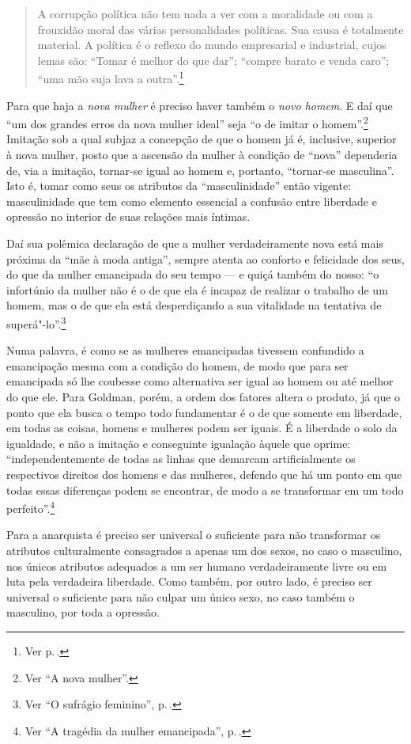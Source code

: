 \begin{quote}
A corrupção política não tem nada a ver com a
moralidade ou com a frouxidão moral das várias personalidades
políticas. Sua causa é totalmente material. A política é o reflexo do
mundo empresarial e industrial, cujos lemas são: ``Tomar é melhor do que
dar''; ``compre barato e venda caro''; ``uma mão suja lava a outra''.\footnote{Ver p.\,\pageref{suja}.}
\end{quote}

Para que haja a \textit{nova mulher} é preciso haver também o \textit{novo homem}. E
daí que ``um dos grandes erros da nova mulher ideal'' seja ``o de imitar
o homem''.\footnote{Ver ``A nova mulher''.} Imitação sob a qual subjaz a concepção de
que o homem já é, inclusive, superior à nova mulher, posto que a
ascensão da mulher à condição de ``nova'' dependeria de, via a imitação,
tornar-se igual ao homem e, portanto, ``tornar-se masculina''. Isto é,
tomar como seus os atributos da ``masculinidade'' então vigente:
masculinidade que tem como elemento essencial a confusão entre liberdade e opressão no interior de suas relações mais íntimas.

Daí sua polêmica
declaração de que a mulher verdadeiramente nova está mais próxima da
``mãe à moda antiga'', sempre atenta ao conforto e felicidade dos seus,
do que da mulher emancipada do seu tempo --- e quiçá também do nosso:
``o infortúnio da mulher não é o de que ela é incapaz de realizar o
trabalho de um homem, mas o de que ela está desperdiçando a sua
vitalidade na tentativa de superá"-lo''.\footnote{Ver ``O sufrágio feminino'', p.\,\pageref{secular}.}

Numa palavra, é como se as mulheres emancipadas tivessem
confundido a emancipação mesma com a condição do homem, de modo que para
ser emancipada só lhe coubesse como alternativa ser igual ao homem ou
até melhor do que ele. Para Goldman, porém, a ordem dos fatores
altera o produto, já que o ponto que ela
busca o tempo todo fundamentar é o de que somente em liberdade,
em todas as coisas, homens e mulheres podem ser iguais. É a liberdade
o solo da igualdade, e não a imitação e conseguinte igualação
àquele que oprime: ``independentemente de todas as linhas que demarcam artificialmente os
respectivos direitos dos homens e das mulheres, defendo que há um ponto
em que todas essas diferenças podem se encontrar, de modo a se
transformar em um todo perfeito''.\footnote{Ver ``A tragédia da mulher emancipada'', p.\,\pageref{perfeito}.}


Para
a anarquista é preciso ser universal o suficiente para não transformar
os atributos culturalmente consagrados a apenas um dos sexos, no caso o
masculino, nos únicos atributos adequados a um ser humano
verdadeiramente livre ou em luta pela verdadeira liberdade. Como também,
por outro lado, é preciso ser universal o suficiente para não culpar um
único sexo, no caso também o masculino, por toda a opressão.

